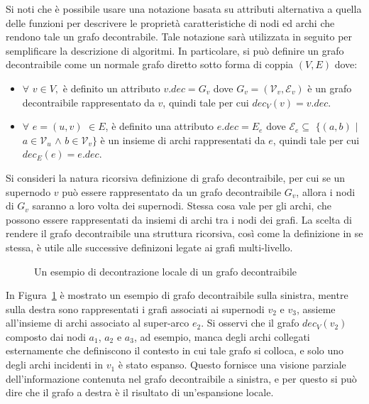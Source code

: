     Si noti che \`e possibile usare una notazione basata su attributi alternativa a quella delle funzioni per
    descrivere le propriet\`a caratteristiche di nodi ed archi che rendono tale un grafo decontrabile.
    Tale notazione sar\`a utilizzata in seguito per semplificare la descrizione di algoritmi. \newline
    In particolare, si pu\`o definire un grafo decontraibile come un normale grafo diretto sotto forma di coppia
    $(V, E)$ dove:
    \begin{itemize}
        \item $\forall$ $v \in V,$ \`e definito un attributo $v.dec = G_v$ dove $G_v = (\mathcal{V}_v, \mathcal{E}_v)$ \`e un
            grafo decontraibile rappresentato da $v$, quindi tale per cui $dec_V(v) = v.dec$.
        \item $\forall$ $e=(u, v)$  $\in E$, \`e definito una attributo $e.dec = E_e$ dove
            $\mathcal{E}_e \subseteq$ $\{(a, b)$ $\mid$ $a \in \mathcal{V}_u$ $\wedge$ $b \in \mathcal{V}_v\}$ \`e un insieme di archi
            rappresentati da $e$, quindi tale per cui $dec_E(e) = e.dec$.
    \end{itemize}

    Si consideri la natura ricorsiva definizione di grafo decontraibile, per cui se un supernodo $v$ pu\`o essere
    rappresentato da un grafo decontraibile $G_v$, allora i nodi di $G_v$ saranno a loro volta dei supernodi.
    Stessa cosa vale per gli archi, che possono essere rappresentati da insiemi di archi tra i nodi dei grafi.
    La scelta di rendere il grafo decontraibile una struttura ricorsiva, cos\`{i} come la definizione in se stessa,
    \`e utile alle successive definizoni legate ai grafi multi-livello. \newline

    \begin{figure}[h!]
      \centering
      
      \caption{Un esempio di decontrazione locale di un grafo decontraibile}
      \label{fig:dec-graph-example}
    \end{figure}

    In Figura~\ref{fig:dec-graph-example} \`e mostrato un esempio di grafo decontraibile sulla sinistra, mentre sulla
    destra sono rappresentati i grafi associati ai supernodi $v_2$ e $v_3$, assieme all'insieme di archi associato
    al super-arco $e_2$.
    Si osservi che il grafo $dec_V(v_2)$ composto dai nodi $a_1$, $a_2$ e $a_3$, ad esempio, manca degli archi collegati
    esternamente che definiscono il contesto in cui tale grafo si colloca, e solo uno degli archi incidenti
    in $v_1$ \`e stato espanso.
    Questo fornisce una visione parziale dell'informazione contenuta nel grafo decontraibile a sinistra,
    e per questo si pu\`o dire che il grafo a destra \`e il risultato di un'espansione locale. \newline

